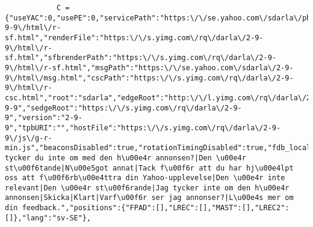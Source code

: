 \begin{verbatim}
            C = {"useYAC":0,"usePE":0,"servicePath":"https:\/\/se.yahoo.com\/sdarla\/php\/fc.php","xservicePath":"","beaconPath":"https:\/\/se.yahoo.com\/sdarla\/php\/b.php","renderPath":"","allowFiF":false,"srenderPath":"https:\/\/s.yimg.com\/rq\/darla\/2-9-9\/html\/r-sf.html","renderFile":"https:\/\/s.yimg.com\/rq\/darla\/2-9-9\/html\/r-sf.html","sfbrenderPath":"https:\/\/s.yimg.com\/rq\/darla\/2-9-9\/html\/r-sf.html","msgPath":"https:\/\/se.yahoo.com\/sdarla\/2-9-9\/html\/msg.html","cscPath":"https:\/\/s.yimg.com\/rq\/darla\/2-9-9\/html\/r-csc.html","root":"sdarla","edgeRoot":"http:\/\/l.yimg.com\/rq\/darla\/2-9-9","sedgeRoot":"https:\/\/s.yimg.com\/rq\/darla\/2-9-9","version":"2-9-9","tpbURI":"","hostFile":"https:\/\/s.yimg.com\/rq\/darla\/2-9-9\/js\/g-r-min.js","beaconsDisabled":true,"rotationTimingDisabled":true,"fdb_locale":"Vill tycker du inte om med den h\u00e4r annonsen?|Den \u00e4r st\u00f6tande|N\u00e5got annat|Tack f\u00f6r att du har hj\u00e4lpt oss att f\u00f6rb\u00e4ttra din Yahoo-upplevelse|Den \u00e4r inte relevant|Den \u00e4r st\u00f6rande|Jag tycker inte om den h\u00e4r annonsen|Skicka|Klart|Varf\u00f6r ser jag annonser?|L\u00e4s mer om din feedback.","positions":{"FPAD":[],"LREC":[],"MAST":[],"LREC2":[]},"lang":"sv-SE"},

\end{verbatim}
